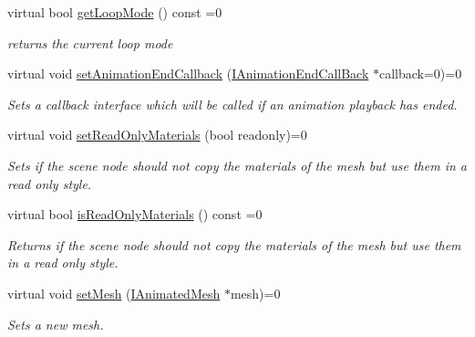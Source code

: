 \begin{DoxyCompactItemize}
virtual bool \hyperlink{classirr_1_1scene_1_1IAnimatedMeshSceneNode_a3271dc33b1911d637b05c58f17398a0a}{get\+Loop\+Mode} () const =0
\begin{DoxyCompactList}\small\item\em returns the current loop mode \end{DoxyCompactList}\item 
virtual void \hyperlink{classirr_1_1scene_1_1IAnimatedMeshSceneNode_ad688bb5a7654116d1ee823e48393f1bd}{set\+Animation\+End\+Callback} (\hyperlink{classirr_1_1scene_1_1IAnimationEndCallBack}{I\+Animation\+End\+Call\+Back} $\ast$callback=0)=0
\begin{DoxyCompactList}\small\item\em Sets a callback interface which will be called if an animation playback has ended. \end{DoxyCompactList}\item 
virtual void \hyperlink{classirr_1_1scene_1_1IAnimatedMeshSceneNode_af04e917ab3cae5631b06edad2d8a3a04}{set\+Read\+Only\+Materials} (bool readonly)=0
\begin{DoxyCompactList}\small\item\em Sets if the scene node should not copy the materials of the mesh but use them in a read only style. \end{DoxyCompactList}\item 
\mbox{\label{classirr_1_1scene_1_1IAnimatedMeshSceneNode_a8916713c72582d270f6363c9ed1b509e}} 
virtual bool \hyperlink{classirr_1_1scene_1_1IAnimatedMeshSceneNode_a8916713c72582d270f6363c9ed1b509e}{is\+Read\+Only\+Materials} () const =0
\begin{DoxyCompactList}\small\item\em Returns if the scene node should not copy the materials of the mesh but use them in a read only style. \end{DoxyCompactList}\item 
\mbox{\label{classirr_1_1scene_1_1IAnimatedMeshSceneNode_af3027cb62d62968a0ae85c9f15725668}} 
virtual void \hyperlink{classirr_1_1scene_1_1IAnimatedMeshSceneNode_af3027cb62d62968a0ae85c9f15725668}{set\+Mesh} (\hyperlink{classirr_1_1scene_1_1IAnimatedMesh}{I\+Animated\+Mesh} $\ast$mesh)=0
\begin{DoxyCompactList}\small\item\em Sets a new mesh. \end{DoxyCompactList}\item 

\end{DoxyCompactItemize}
